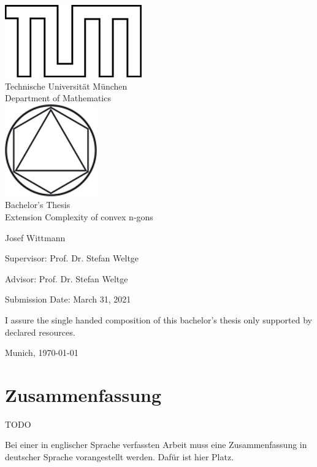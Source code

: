 \begin{titlepage}
\begin{center}
\includegraphics{assets/TUMlschwarz.png}\\[3mm]
\sf
{\Large
  Technische Universit\"at M\"unchen\\[5mm]
  Department of Mathematics\\[8mm]
}
\normalsize
\includegraphics{assets/TUMlMschwarz.png}\\[15mm]

Bachelor's Thesis\\[15mm]

{\Huge
  Extension Complexity of convex n-gons
}
\bigskip

\normalsize

Josef Wittmann
\end{center}
\vspace*{75mm}

Supervisor: Prof. Dr. Stefan Weltge
\medskip

Advisor: Prof. Dr. Stefan Weltge
\medskip

Submission Date: March 31, 2021

\end{titlepage}

\vspace*{150mm}

I assure the single handed composition of this bachelor's thesis only supported by declared resources.
\bigskip

Munich, \today
\newpage

\section*{Zusammenfassung}

{\Huge TODO}

Bei einer in englischer Sprache verfassten Arbeit muss eine Zusammenfassung in deutscher Sprache vorangestellt werden.
Daf\"ur ist hier Platz.

\newpage